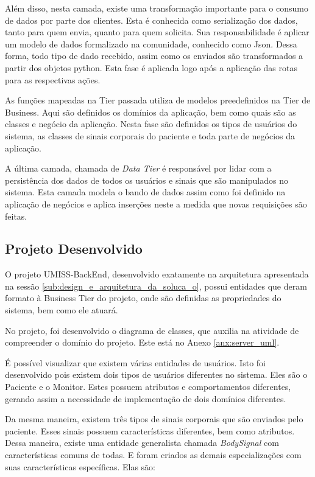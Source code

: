 Além disso, nesta camada, existe uma transformação importante para o consumo de dados por parte dos clientes.
Esta é conhecida como serialização dos dados, tanto para quem envia, quanto para quem solicita.
Sua responsabilidade é aplicar um modelo de dados formalizado na comunidade, conhecido como Json.
Dessa forma, todo tipo de dado recebido, assim como os enviados são transformados  a partir
dos objetos python. Esta fase é aplicada logo após a aplicação das rotas para as respectivas
ações.

As funções mapeadas na Tier passada utiliza de modelos preedefinidos na Tier de Business.
Aqui são definidos os domínios da aplicação, bem como quais são as classes e negócio da
aplicação. Nesta fase são definidos os tipos de usuários do sistema, as classes de sinais
corporais do paciente e toda parte  de negócios da aplicação.

A última camada, chamada de \textit{Data Tier} é responsável por lidar com a persistência dos dados
de todos os usuários e sinais que são manipulados no sistema. Esta camada modela o
bando de dados assim como foi definido na aplicação de negócios e aplica
inserções neste a medida que novas requisições são feitas.

\subsection{Projeto Desenvolvido}
\label{sub:projetodesenvolvido}

O projeto UMISS-BackEnd, desenvolvido exatamente na arquitetura apresentada na sessão
\ref{sub:design_e_arquitetura_da_soluca_o}, possui entidades que deram formato à Business
Tier do projeto, onde são definidas as propriedades do sistema, bem como ele atuará.

No projeto, foi desenvolvido o diagrama de classes, que auxilia na atividade de compreender
o domínio do projeto. Este está no Anexo \ref{anx:server_uml}.

É possível visualizar que existem várias entidades de usuários. Isto foi desenvolvido pois
existem dois tipos de usuários diferentes no sistema. Eles são o Paciente e o Monitor. Estes
possuem atributos e comportamentos diferentes, gerando assim a necessidade de implementação
de dois domínios diferentes.

Da mesma maneira, existem três tipos de sinais corporais que são enviados pelo paciente.
Esses sinais possuem características diferentes, bem como atributos. Dessa maneira, existe
uma entidade generalista chamada \textit{BodySignal} com características comuns de todas. E
foram criados as demais especializações com suas características  específicas. Elas são:

